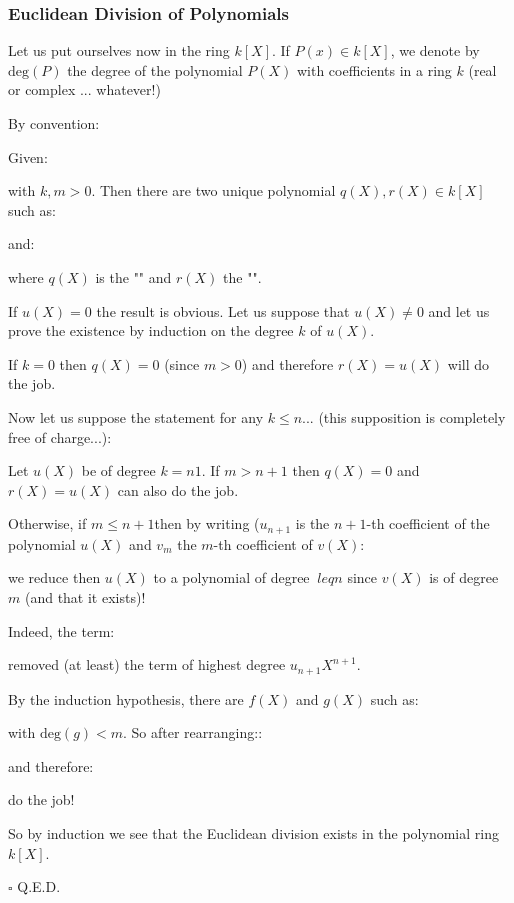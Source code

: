 	\subsubsection{Euclidean Division of Polynomials}
	Let us put ourselves now in the ring $k[X]$. If $P(x)\in k[X]$, we denote by $\text{deg}(P)$ the degree of the polynomial $P(X)$ with coefficients in a ring $k$ (real or complex ... whatever!)
	\begin{tcolorbox}[title=Remark,colframe=black,arc=10pt]
	By convention:
	
	\end{tcolorbox}
	\begin{theorem}
	Given:
	
	with $k,m>0$. Then there are two unique polynomial $q(X),r(X)\in k[X]$ such as:
	
	and:
	
	where $q(X)$ is the "" and $r(X)$ the "".
	\end{theorem}
	\begin{dem}
	If $u (X) = 0$ the result is obvious. Let us suppose that $u(X)\neq 0$ and let us prove the existence by induction on the degree $k$ of $u (X)$.
	
	If $k = 0$ then $q (X) = 0$ (since $m>0$) and therefore $r (X) = u (X)$ will do the job.
	
	Now let us suppose the statement for any $k\leq n$... (this supposition is completely free of charge...):
	
	Let $u (X)$ be of degree $k=n1$. If $m>n+1$ then $q (X) = 0$ and $r (X) = u (X)$ can also do the job.
	
	Otherwise, if $m\leq n+1$then by writing ($u_{n+1}$ is the $n+1$-th coefficient of the polynomial $u(X)$ and $v_m$ the $m$-th coefficient of $v(X)$:
	
	we reduce then $ u (X) $ to a polynomial of degree $ \ leq n $ since $v (X)$ is of degree $m$ (and that it exists)!
	
	Indeed, the term:
	
	removed (at least) the term of highest degree $u_{n+1}X^{n+1}$.
	
	By the induction hypothesis, there are $f(X)$ and $g(X)$ such as:
	
	with $\text{deg}(g)<m$. So after rearranging::
	
	and therefore:
	
	do the job!
	
	So by induction we see that the Euclidean division exists in the polynomial ring $k[X]$.
	\begin{flushright}
		$\square$  Q.E.D.
	\end{flushright}
	\end{dem}
